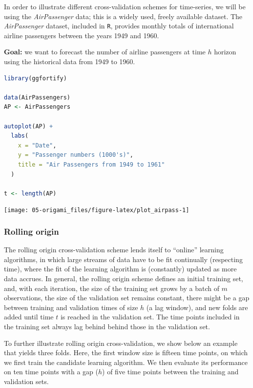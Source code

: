 \documentclass[
  12pt, krantz2,
]{krantz}
\newcommand{\passthrough}[1]{#1}
\newcommand{\1}{\mathbbm{1}}
\theoremstyle{definition}
\theoremstyle{definition}
\theoremstyle{definition}
\theoremstyle{definition}
\theoremstyle{remark}
\begin{document}
In order to illustrate different cross-validation schemes for time-series, we
will be using the \emph{AirPassenger} data; this is a widely used, freely available
dataset. The \emph{AirPassenger} dataset, included in \passthrough{\lstinline!R!}, provides monthly totals of
international airline passengers between the years 1949 and 1960.

\textbf{Goal:} we want to forecast the number of airline passengers at time \(h\)
horizon using the historical data from 1949 to 1960.

\begin{lstlisting}[language=R]
library(ggfortify)

data(AirPassengers)
AP <- AirPassengers

autoplot(AP) +
  labs(
    x = "Date",
    y = "Passenger numbers (1000's)",
    title = "Air Passengers from 1949 to 1961"
  )

t <- length(AP)
\end{lstlisting}

\begin{center}\texttt{[image: 05-origami\_files/figure-latex/plot\_airpass-1]} \end{center}

\hypertarget{rolling-origin}{%
\subsubsection{Rolling origin}\label{rolling-origin}}

The rolling origin cross-validation scheme lends itself to ``online'' learning
algorithms, in which large streams of data have to be fit continually
(respecting time), where the fit of the learning algorithm is (constantly)
updated as more data accrues. In general, the rolling origin scheme defines an
initial training set, and, with each iteration, the size of the training set
grows by a batch of \(m\) observations, the size of the validation set remains
constant, there might be a gap between training and validation times of size
\(h\) (a lag window), and new folds are added until time \(t\) is reached in the
validation set. The time points included in the training set always lag behind
behind those in the validation set.

To further illustrate rolling origin cross-validation, we show below an example
that yields three folds. Here, the first window size is fifteen time points, on
which we first train the candidate learning algorithm. We then evaluate its
performance on ten time points with a gap (\(h\)) of five time points between the
training and validation sets.
\end{document}

